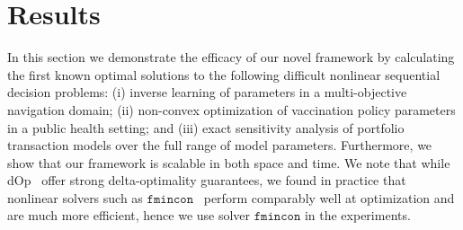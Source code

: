 \section{Results}
\label{sec:results}

In this section we demonstrate the efficacy of our novel framework by calculating the first known optimal solutions to the following difficult nonlinear sequential decision problems: (i) inverse learning of parameters in a multi-objective navigation domain; (ii) non-convex optimization of vaccination policy parameters in a public health setting; and (iii) exact sensitivity analysis of portfolio transaction models over the full range of model parameters. Furthermore, we show that our framework is scalable in both space and time. We note that while dOp~\parencite{Gao2013} offer strong delta-optimality guarantees, we found in practice that nonlinear solvers such as $ \mathtt{fmincon} $~\parencite{MATLAB_2010} perform comparably well at optimization and are much more efficient, hence we use solver $ \mathtt{fmincon} $ in the experiments.


